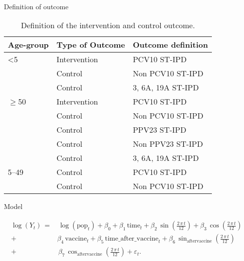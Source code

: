 \documentclass{beamer}\usepackage[]{graphicx}\usepackage[]{color}
\newcommand{\Sin}[1]{\sin\left(#1\right)}%
\newcommand{\Cos}[1]{\cos\left(#1\right)}%
\newcommand{\Log}[1]{\log\left(#1\right)}%
\begin{document}
\begin{frame}[fragile]{Definition of outcome}
\begin{table}[]
\centering
\caption{Definition of the intervention and control outcome.}
\begin{tabular}{lll}
\hline
Age-group  & Type of Outcome & Outcome definition \\\hline
<5         & Intervention    & PCV10 ST-IPD       \\
           & Control         & Non PCV10 ST-IPD   \\
           & Control         & 3, 6A, 19A ST-IPD  \\\hline
$\ge$50     & Intervention    & PCV10 ST-IPD       \\
           & Control         & Non PCV10 ST-IPD   \\
           & Control         & PPV23 ST-IPD       \\
           & Control         & Non PPV23 ST-IPD   \\
           & Control         & 3, 6A, 19A ST-IPD  \\\hline
5--49      & Control         & PCV10 ST-IPD       \\
           & Control         & Non PCV10 ST-IPD   \\\hline
\end{tabular}
\end{table}
\end{frame}

\begin{frame}[fragile]{Model}
\begin{center}
\begin{align*}
\begin{split}
\Log{Y_t}\, =&\, \Log{\text{pop}_t}+\beta_0+\beta_1\,\text{time}_t+\beta_2\,\Sin{\frac{2\,\pi\,t}{12}}+\beta_3\,\Cos{\frac{2\,\pi\,t}{12}} \\
  +& \beta_4\,\text{vaccine}_t +\beta_5\,\text{time\_after\_vaccine}_t + \beta_6\,\sin_{\text{aftervaccine}} \left(\frac{2\,\pi\,t}{12}\right)\\
  +&\,\beta_7\,\cos_{\text{aftervaccine}}\left(\frac{2\,\pi\,t}{12}\right)+\varepsilon_t.
\end{split}
\end{align*}

\end{center}
\end{frame}
\end{document}

